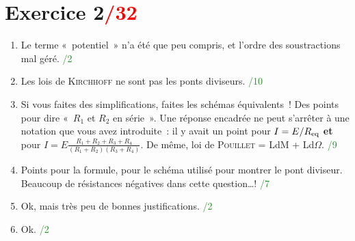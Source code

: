 \documentclass[a4paper, 10pt, final, garamond]{book}
\begin{document}
\section{Exercice 2\hfill \textcolor{red}{/32}}

\begin{enumerate}
    \item Le terme «~potentiel~» n'a été que peu compris, et l'ordre des
        soustractions mal géré. \hfill \textcolor{ForestGreen}{/2}

    \item Les lois de \textsc{Kirchhoff} ne sont pas les ponts diviseurs. \hfill
        \textcolor{ForestGreen}{/10}

    \item Si vous faites des simplifications, faites les schémas équivalents~!
        Des points pour dire «~$R_1$ et $R_2$ en série~». Une réponse encadrée
        ne peut s'arrêter à une notation que vous avez introduite~: il y avait
        un point pour $I = E/R_{\rm eq}$ \textbf{et} pour $I = E\frac{R_1 + R_2 +
        R_3 + R_4}{(R_1+R_2)(R_3+R_4)}$. De même, loi de \textsc{Pouillet} = LdM
        + Ld$\Omega$. \hfill \textcolor{ForestGreen}{/9}

    \item Points pour la formule, pour le schéma utilisé pour montrer le pont
        diviseur. Beaucoup de résistances négatives dans cette question…! \hfill
        \textcolor{ForestGreen}{/7}

    \item Ok, mais très peu de bonnes justifications. \hfill
        \textcolor{ForestGreen}{/2}

    \item Ok. \hfill \textcolor{ForestGreen}{/2}
\end{enumerate}
\end{document}
